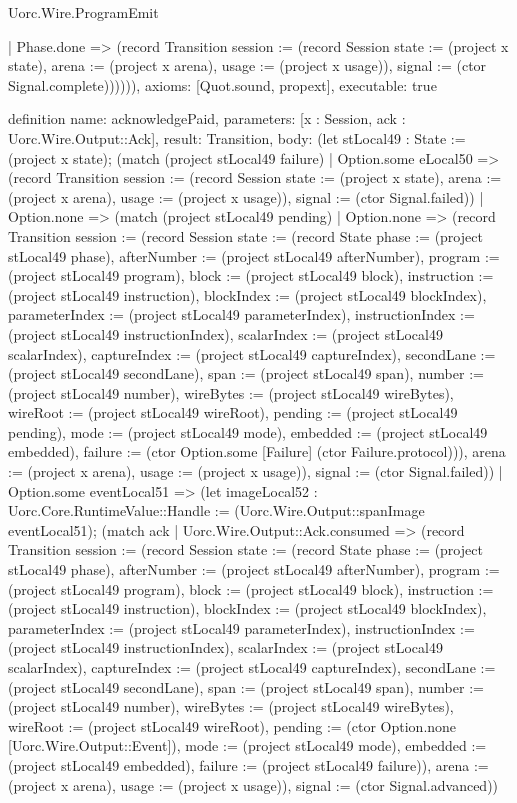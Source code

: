 \begin{lexlean}{Uorc.Wire.ProgramEmit}
\begin{semanticmodule}
{        | Phase.done => (record Transition {session := (record Session {state := (project x state), arena := (project x arena), usage := (project x usage)}), signal := (ctor Signal.complete)}))))),
  axioms: [Quot.sound, propext],
  executable: true
}

definition{
  name: acknowledgePaid,
  parameters: [x : Session, ack : Uorc.Wire.Output::Ack],
  result: Transition,
  body: (let stLocal49 : State := (project x state); (match (project stLocal49 failure)
    | Option.some eLocal50 => (record Transition {session := (record Session {state := (project x state), arena := (project x arena), usage := (project x usage)}), signal := (ctor Signal.failed)})
    | Option.none => (match (project stLocal49 pending)
      | Option.none => (record Transition {session := (record Session {state := (record State {phase := (project stLocal49 phase), afterNumber := (project stLocal49 afterNumber), program := (project stLocal49 program), block := (project stLocal49 block), instruction := (project stLocal49 instruction), blockIndex := (project stLocal49 blockIndex), parameterIndex := (project stLocal49 parameterIndex), instructionIndex := (project stLocal49 instructionIndex), scalarIndex := (project stLocal49 scalarIndex), captureIndex := (project stLocal49 captureIndex), secondLane := (project stLocal49 secondLane), span := (project stLocal49 span), number := (project stLocal49 number), wireBytes := (project stLocal49 wireBytes), wireRoot := (project stLocal49 wireRoot), pending := (project stLocal49 pending), mode := (project stLocal49 mode), embedded := (project stLocal49 embedded), failure := (ctor Option.some [Failure] (ctor Failure.protocol))}), arena := (project x arena), usage := (project x usage)}), signal := (ctor Signal.failed)})
      | Option.some eventLocal51 => (let imageLocal52 : Uorc.Core.RuntimeValue::Handle := (Uorc.Wire.Output::spanImage eventLocal51); (match ack
        | Uorc.Wire.Output::Ack.consumed => (record Transition {session := (record Session {state := (record State {phase := (project stLocal49 phase), afterNumber := (project stLocal49 afterNumber), program := (project stLocal49 program), block := (project stLocal49 block), instruction := (project stLocal49 instruction), blockIndex := (project stLocal49 blockIndex), parameterIndex := (project stLocal49 parameterIndex), instructionIndex := (project stLocal49 instructionIndex), scalarIndex := (project stLocal49 scalarIndex), captureIndex := (project stLocal49 captureIndex), secondLane := (project stLocal49 secondLane), span := (project stLocal49 span), number := (project stLocal49 number), wireBytes := (project stLocal49 wireBytes), wireRoot := (project stLocal49 wireRoot), pending := (ctor Option.none [Uorc.Wire.Output::Event]), mode := (project stLocal49 mode), embedded := (project stLocal49 embedded), failure := (project stLocal49 failure)}), arena := (project x arena), usage := (project x usage)}), signal := (ctor Signal.advanced)})
}
\end{semanticmodule}
\end{lexlean}
